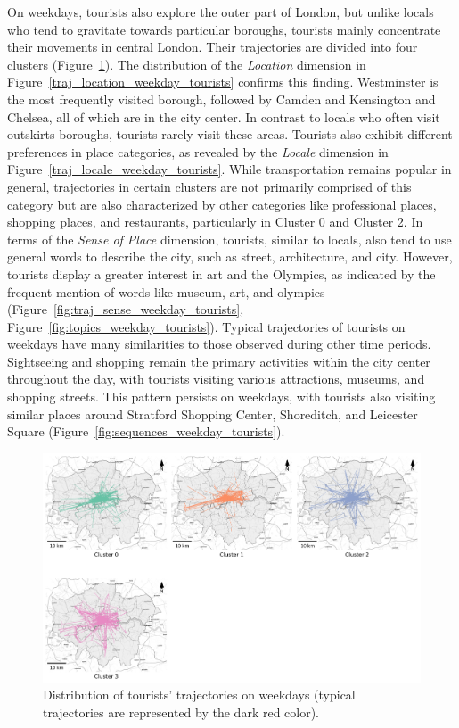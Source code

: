 \documentclass{article}
\theoremstyle{definition}
\theoremstyle{remark}
\begin{document}
On weekdays, tourists also explore the outer part of London, but unlike locals who tend to gravitate towards particular boroughs, tourists mainly concentrate their movements in central London. Their trajectories are divided into four clusters (Figure~\ref{fig:traj_distribution_weekday_tourists}). The distribution of the \textit{Location} dimension in Figure~\ref{traj_location_weekday_tourists} confirms this finding. Westminster is the most frequently visited borough, followed by Camden and Kensington and Chelsea, all of which are in the city center. In contrast to locals who often visit outskirts boroughs, tourists rarely visit these areas. Tourists also exhibit different preferences in place categories, as revealed by the \textit{Locale} dimension in Figure~\ref{traj_locale_weekday_tourists}. While transportation remains popular in general, trajectories in certain clusters are not primarily comprised of this category but are also characterized by other categories like professional places, shopping places, and restaurants, particularly in Cluster 0 and Cluster 2. In terms of the \textit{Sense of Place} dimension, tourists, similar to locals, also tend to use general words to describe the city, such as street, architecture, and city. However, tourists display a greater interest in art and the Olympics, as indicated by the frequent mention of words like museum, art, and olympics (Figure~\ref{fig:traj_sense_weekday_tourists}, Figure~\ref{fig:topics_weekday_tourists}). Typical trajectories of tourists on weekdays have many similarities to those observed during other time periods. Sightseeing and shopping remain the primary activities within the city center throughout the day, with tourists visiting various attractions, museums, and shopping streets. This pattern persists on weekdays, with tourists also visiting similar places around Stratford Shopping Center, Shoreditch, and Leicester Square (Figure~\ref{fig:sequences_weekday_tourists}).

\begin{figure}[!h]
\centering
\includegraphics[width=1\textwidth]{figures/traj_distribution_weekday_tourists.png}
\caption{\label{fig:traj_distribution_weekday_tourists}Distribution of tourists' trajectories on weekdays (typical trajectories are represented by the dark red color).}
\end{figure}
\end{document}
